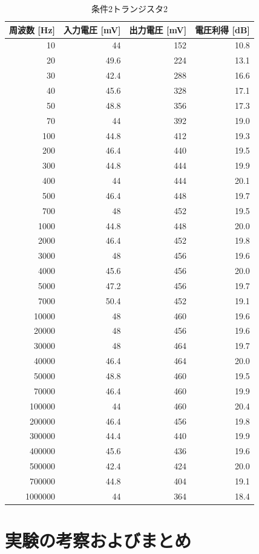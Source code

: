\documentclass[a4paper,11pt,xelatex,ja=standard]{bxjsarticle}
\begin{document}
        \begin{table}[H]
            \centering
            \caption{条件2トランジスタ2}
            \begin{tabular}{rrrr}
                \hline
                周波数 [Hz] & 入力電圧 [mV] & 出力電圧 [mV] & 電圧利得 [dB] \\
                \hline\hline
                10 & 44 & 152 & 10.8 \\
                20 & 49.6 & 224 & 13.1 \\
                30 & 42.4 & 288 & 16.6 \\
                40 & 45.6 & 328 & 17.1 \\
                50 & 48.8 & 356 & 17.3 \\
                70 & 44 & 392 & 19.0 \\
                100 & 44.8 & 412 & 19.3 \\
                200 & 46.4 & 440 & 19.5 \\
                300 & 44.8 & 444 & 19.9 \\
                400 & 44 & 444 & 20.1 \\
                500 & 46.4 & 448 & 19.7 \\
                700 & 48 & 452 & 19.5 \\
                1000 & 44.8 & 448 & 20.0 \\
                2000 & 46.4 & 452 & 19.8 \\
                3000 & 48 & 456 & 19.6 \\
                4000 & 45.6 & 456 & 20.0 \\
                5000 & 47.2 & 456 & 19.7 \\
                7000 & 50.4 & 452 & 19.1 \\
                10000 & 48 & 460 & 19.6 \\
                20000 & 48 & 456 & 19.6 \\
                30000 & 48 & 464 & 19.7 \\
                40000 & 46.4 & 464 & 20.0 \\
                50000 & 48.8 & 460 & 19.5 \\
                70000 & 46.4 & 460 & 19.9 \\
                100000 & 44 & 460 & 20.4 \\
                200000 & 46.4 & 456 & 19.8 \\
                300000 & 44.4 & 440 & 19.9 \\
                400000 & 45.6 & 436 & 19.6 \\
                500000 & 42.4 & 424 & 20.0 \\
                700000 & 44.8 & 404 & 19.1 \\
                1000000 & 44 & 364 & 18.4 \\
                \hline
            \end{tabular}
        \end{table}

\section{実験の考察およびまとめ}
\end{document}
